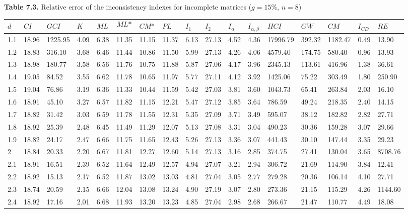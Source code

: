 \newpage
\textbf{Table 7.3.} Relative error of the inconsistency indexes for incomplete matrices ($g=15\%$, $n=8$)
\begin{adjustbox}{angle=90}
  \begin{center}
    \begin{tabular}{|l|llllllllllllllll|}
      \hline $d$ &
$\textit{CI}$&$\textit{GCI}$&$K$&$\textit{ML}$&$$\textit{ML*}$$&$\textit{CM*}$&$\textit{PL}$&$\textit{I}_1$&$\textit{I}_2$&$\textit{I}_{\alpha}$&$\textit{I}_{\alpha,\beta}$&$\textit{HCI}$&$\textit{GW}$&$\textit{CM}$&$\textit{I}_{CD}$&$\textit{RE}$\\ \hline \hline
1.1&18.96&1225.95&4.09&6.38&11.35&11.15&11.37&6.13&27.13&4.52&4.36&17996.79&392.32&1182.47&0.49&13.90  \\ 
1.2&18.83&316.10&3.68&6.46&11.44&10.86&11.50&5.99&27.13&4.26&4.06&4579.40&174.75&580.40&0.96&13.93  \\ 
1.3&18.98&180.77&3.58&6.56&11.76&10.75&11.88&5.87&27.06&4.17&3.96&2345.13&113.61&416.96&1.38&36.61  \\ 
1.4&19.05&84.52&3.55&6.62&11.78&10.65&11.97&5.77&27.11&4.12&3.92&1425.06&75.22&303.49&1.80&250.90  \\ 
1.5&19.04&76.86&3.19&6.36&11.33&10.44&11.59&5.42&27.03&3.81&3.60&1043.73&65.41&263.84&2.03&16.10  \\ 
1.6&18.91&45.10&3.27&6.57&11.82&11.15&12.21&5.47&27.12&3.85&3.64&786.59&49.24&218.35&2.40&14.15  \\ 
1.7&18.82&31.42&3.03&6.59&11.78&11.55&12.31&5.35&27.09&3.71&3.49&595.07&38.12&182.82&2.82&27.71  \\ 
1.8&18.92&25.39&2.48&6.45&11.49&11.29&12.07&5.13&27.08&3.31&3.04&490.23&30.36&159.28&3.07&29.66  \\ 
1.9&18.82&24.17&2.47&6.66&11.75&11.65&12.43&5.26&27.13&3.36&3.07&441.43&30.10&147.44&3.35&29.23  \\ 
2 &18.84&20.33&2.20&6.67&11.81&12.27&12.60&5.14&27.13&3.16&2.85&374.75&27.41&130.04&3.65&8708.76  \\ 
2.1&18.91&16.51&2.39&6.52&11.64&12.49&12.57&4.94&27.07&3.21&2.94&306.72&21.69&114.90&3.84&12.41  \\ 
2.2&18.92&15.13&2.17&6.52&11.87&13.02&13.03&4.81&27.04&3.05&2.77&279.28&20.36&106.14&4.10&27.71  \\ 
2.3&18.74&20.59&2.15&6.66&12.04&13.08&13.24&4.90&27.19&3.07&2.80&273.36&21.15&115.29&4.26&1144.60  \\ 
2.4&18.92&17.16&2.01&6.68&11.93&13.20&13.23&4.85&27.04&2.98&2.68&266.67&21.47&110.77&4.49&18.08  \\ 

\end{tabular}
\end{center}
\end{adjustbox}

